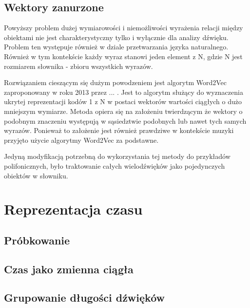 {{        \subsection{Wektory zanurzone}
        {
            Powyższy problem dużej wymiarowości i niemożliwości wyrażenia relacji między obiektami nie jest
            charakterystyczny tylko i wyłącznie dla analizy dźwięku. Problem ten występuje również w dziale
            przetwarzania języka naturalnego. Również w tym kontekście każdy wyraz stanowi
            jeden element z N, gdzie N jest rozmiarem słownika - zbioru wszystkich wyrazów.

            Rozwiązaniem cieszącym się dużym powodzeniem jest algorytm Word2Vec zaproponowany w roku 2013 przez ... .
            Jest to algorytm służący do wyznaczenia ukrytej reprezentacji kodów 1 z N w postaci wektorów wartości ciągłych
            o dużo mniejszym wymiarze. Metoda opiera się na założeniu twierdzącym że wektory 
            o podobnym znaczeniu występują w sąsiedztwie podobnych lub nawet tych samych wyrazów. Ponieważ to założenie 
            jest również prawdziwe w kontekście muzyki przyjęto użycie algorytmy Word2Vec za podstawne.
            
            Jedyną modyfikacją potrzebną do wykorzystania tej metody do przykładów polifonicznych, było traktowanie 
            całych wielodźwięków jako pojedynczych obiektów w słowniku.
        }
    }

    \section{Reprezentacja czasu}
    {
        \subsection{Próbkowanie}
        {

        }

        \subsection{Czas jako zmienna ciągła}
        {

        }

        \subsection{Grupowanie długości dźwięków}
        {

        }
    }
}